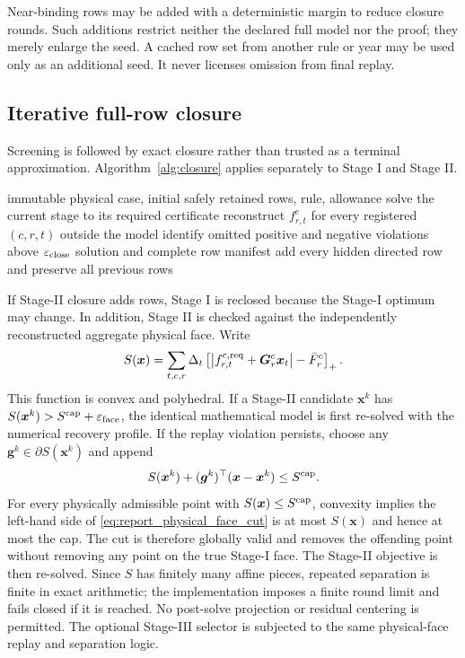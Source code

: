 \documentclass[10pt,journal,onecolumn]{IEEEtran}
\newcommand{\eps}{\varepsilon}
\begin{document}
Near-binding rows may be added with a deterministic margin to reduce closure
rounds. Such additions restrict neither the declared full model nor the proof;
they merely enlarge the seed. A cached row set from another rule or year may be
used only as an additional seed. It never licenses omission from final replay.

\subsection{Iterative full-row closure}

Screening is followed by exact closure rather than trusted as a terminal
approximation. Algorithm~\ref{alg:closure} applies separately to Stage I and
Stage II.

\begin{algorithm}[t]
\caption{Signed-row closure for one lexicographic stage}
\label{alg:closure}
\begin{algorithmic}[1]
\Require immutable physical case, initial safely retained rows, rule, allowance
\Repeat
  \State solve the current stage to its required certificate
  \State reconstruct $f_{r,t}^c$ for every registered $(c,r,t)$ outside the model
  \State identify omitted positive and negative violations above $\eps_{\rm close}$
    \State \Return solution and complete row manifest
  \EndIf
  \State add every hidden directed row and preserve all previous rows
\end{algorithmic}
\end{algorithm}

If Stage-II closure adds rows, Stage I is reclosed because the Stage-I optimum
may change. In addition, Stage II is checked against the independently
reconstructed aggregate physical face. Write
\begin{equation}
S(\bm x)=\sum_{t,c,r}\Delta_t\left[\left|f_{r,t}^{c,\rm req}+\bm G_r^c\bm x_t\right|-\bar F_r^c\right]_+.
\label{eq:report_physical_S_polyhedral}
\end{equation}
This function is convex and polyhedral. If a Stage-II candidate $\bm x^k$ has
$S(\bm x^k)>S^{\rm cap}+\eps_{\rm face}$, the identical mathematical model is first re-solved with the numerical recovery profile. If the replay violation persists, choose any $\bm g^k\in\partial S(\bm x^k)$ and append
\begin{equation}
S(\bm x^k)+(\bm g^k)^\top(\bm x-\bm x^k)\leq S^{\rm cap}.
\label{eq:report_physical_face_cut}
\end{equation}
For every physically admissible point with $S(\bm x)\leq S^{\rm cap}$,
convexity implies the left-hand side of \eqref{eq:report_physical_face_cut} is
at most $S(\bm x)$ and hence at most the cap. The cut is therefore globally
valid and removes the offending point without removing any point on the true
Stage-I face. The Stage-II objective is then re-solved. Since $S$ has finitely
many affine pieces, repeated separation is finite in exact arithmetic; the
implementation imposes a finite round limit and fails closed if it is reached.
No post-solve projection or residual centering is permitted. The optional
Stage-III selector is subjected to the same physical-face replay and separation
logic.
\end{document}
